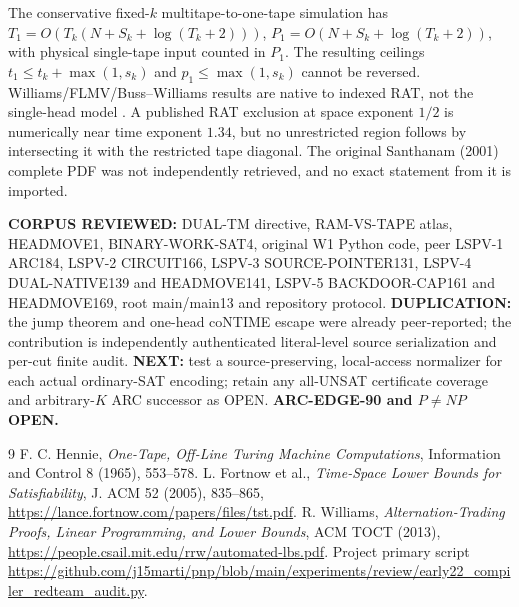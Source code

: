 \documentclass[11pt]{article}
\begin{document}
The conservative fixed-$k$ multitape-to-one-tape simulation has $T_1=O(T_k(N+S_k+\log(T_k+2)))$, $P_1=O(N+S_k+\log(T_k+2))$, with physical single-tape input counted in $P_1$. The resulting ceilings $t_1\le t_k+\max(1,s_k)$ and $p_1\le\max(1,s_k)$ cannot be reversed. Williams/FLMV/Buss--Williams results are native to indexed RAT, not the single-head model \cite{flmv,williams}. A published RAT exclusion at space exponent $1/2$ is numerically near time exponent $1.34$, but no unrestricted region follows by intersecting it with the restricted tape diagonal. The original Santhanam (2001) complete PDF was not independently retrieved, and no exact statement from it is imported.

\noindent\textbf{CORPUS REVIEWED:} DUAL-TM directive, RAM-VS-TAPE atlas, HEADMOVE1, BINARY-WORK-SAT4, original W1 Python code, peer LSPV-1 ARC184, LSPV-2 CIRCUIT166, LSPV-3 SOURCE-POINTER131, LSPV-4 DUAL-NATIVE139 and HEADMOVE141, LSPV-5 BACKDOOR-CAP161 and HEADMOVE169, root main/main13 and repository protocol. \textbf{DUPLICATION:} the jump theorem and one-head coNTIME escape were already peer-reported; the contribution is independently authenticated literal-level source serialization and per-cut finite audit. \textbf{NEXT:} test a source-preserving, local-access normalizer for each actual ordinary-SAT encoding; retain any all-UNSAT certificate coverage and arbitrary-$K$ ARC successor as OPEN. \textbf{ARC-EDGE-90 and $P\ne NP$ OPEN.}

\begin{thebibliography}{9}\small
{} F. C. Hennie, \emph{One-Tape, Off-Line Turing Machine Computations}, Information and Control 8 (1965), 553--578.
 L. Fortnow et al., \emph{Time-Space Lower Bounds for Satisfiability}, J. ACM 52 (2005), 835--865, \url{https://lance.fortnow.com/papers/files/tst.pdf}.
 R. Williams, \emph{Alternation-Trading Proofs, Linear Programming, and Lower Bounds}, ACM TOCT (2013), \url{https://people.csail.mit.edu/rrw/automated-lbs.pdf}.
 Project primary script \url{https://github.com/j15marti/pnp/blob/main/experiments/review/early22_compiler_redteam_audit.py}.
\end{thebibliography}
\end{document}
